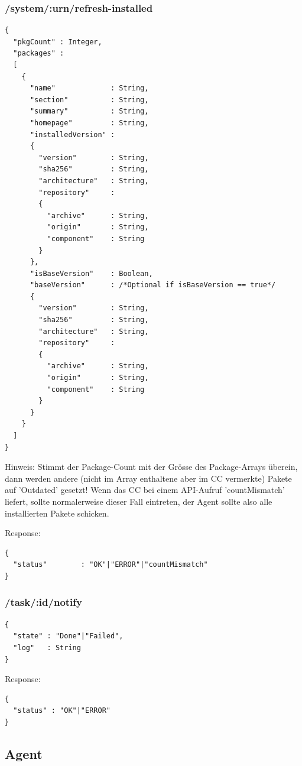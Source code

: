 \subsubsection{/system/:urn/refresh-installed}

\begin{verbatim}
{
  "pkgCount" : Integer,
  "packages" :
  [
    {
      "name"             : String,
      "section"          : String,
      "summary"          : String,
      "homepage"         : String,
      "installedVersion" :
      {
        "version"        : String,
        "sha256"         : String,
        "architecture"   : String,
        "repository"     :
        {
          "archive"      : String,
          "origin"       : String,
          "component"    : String
        }
      },
      "isBaseVersion"    : Boolean,
      "baseVersion"      : /*Optional if isBaseVersion == true*/
      {
        "version"        : String,
        "sha256"         : String,
        "architecture"   : String,
        "repository"     :
        {
          "archive"      : String,
          "origin"       : String,
          "component"    : String
        }
      }
    }
  ]
}
\end{verbatim}

Hinweis: Stimmt der Package-Count mit der Grösse des Package-Arrays überein, dann werden andere (nicht im Array enthaltene aber im CC vermerkte) Pakete auf 'Outdated' gesetzt! Wenn das CC bei einem API-Aufruf 'countMismatch' liefert, sollte normalerweise dieser Fall eintreten, der Agent sollte also alle installierten Pakete schicken.

Response: 

\begin{verbatim}
{
  "status"        : "OK"|"ERROR"|"countMismatch" 
}
\end{verbatim}

\subsubsection{/task/:id/notify}

\begin{verbatim}
{
  "state" : "Done"|"Failed",
  "log"   : String
}
\end{verbatim}

Response: 

\begin{verbatim}
{
  "status" : "OK"|"ERROR" 
}
\end{verbatim}

\subsection{Agent}

